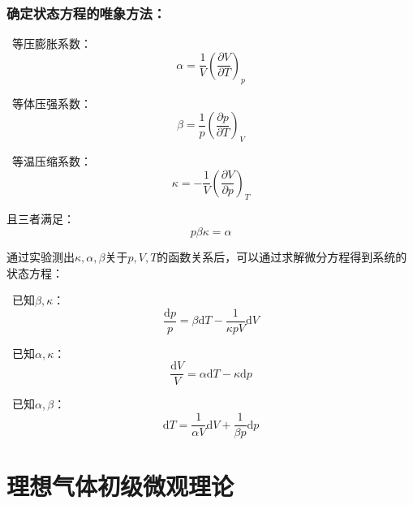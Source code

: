 \documentclass[zihao=-4,UTF8]{report}
\begin{document}
\subsubsection{确定状态方程的唯象方法：}
\ 等压膨胀系数：
\begin{equation}
    \alpha = \frac{1}{V} \left( \frac{\partial V}{\partial T}\right)_p
\end{equation}\par
{}\ 
等体压强系数：
\begin{equation}
    \beta = \frac{1}{p}\left( \frac{\partial p}{\partial T}\right)_V
\end{equation}\par
{}\ 等温压缩系数：
\begin{equation}
    \kappa  = -\frac{1}{V}\left(\frac{\partial V}{\partial p} \right)_T
\end{equation}\par
且三者满足：
\begin{equation}
    p\beta \kappa = \alpha
\end{equation}

通过实验测出$\kappa,\alpha,\beta$关于$p,V,T$的函数关系后，可以通过求解微分方程得到系统的状态方程：\par
\ding{172}\ 已知$\beta,\kappa$：
\begin{equation}
    \frac{\mathrm{d}p}{p} = \beta\mathrm{d}T - \frac{1}{\kappa pV}\mathrm{d}V
\end{equation}\par
{}\ 已知$\alpha,\kappa$：
\begin{equation}
    \frac{\mathrm{d}V}{V} = \alpha \mathrm{d}T - \kappa \mathrm{d}p
\end{equation}\par
{}\ 已知$\alpha,\beta$：
\begin{equation}
    \mathrm{d}T = \frac{1}{\alpha V}\mathrm{d}V + \frac{1}{\beta p}\mathrm{d}p
\end{equation}

\section{理想气体初级微观理论}
\end{document}
